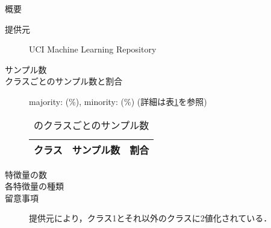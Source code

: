 \begin{description}
    \item[概要] \cite{}
    \item[提供元] UCI Machine Learning Repository
    \item[サンプル数] 
    \item[クラスごとのサンプル数と割合] majority:  (\%), minority:  (\%) (詳細は表\ref{tab:}を参照)

        \begin{table}
            \centering
            \caption{のクラスごとのサンプル数}
            \label{tab:}
            \begin{tabular}{lrc} \hline
                \multicolumn{1}{c}{クラス}&
                \multicolumn{1}{c}{サンプル数}&
                \multicolumn{1}{c}{割合}\\
                \hline
                \hline

                \hline
            \end{tabular}
        \end{table}

    \item[特徴量の数] 
    \item[各特徴量の種類] \mbox{}
        
    \item[留意事項] 提供元により，クラス1とそれ以外のクラスに2値化されている．
\end{description}